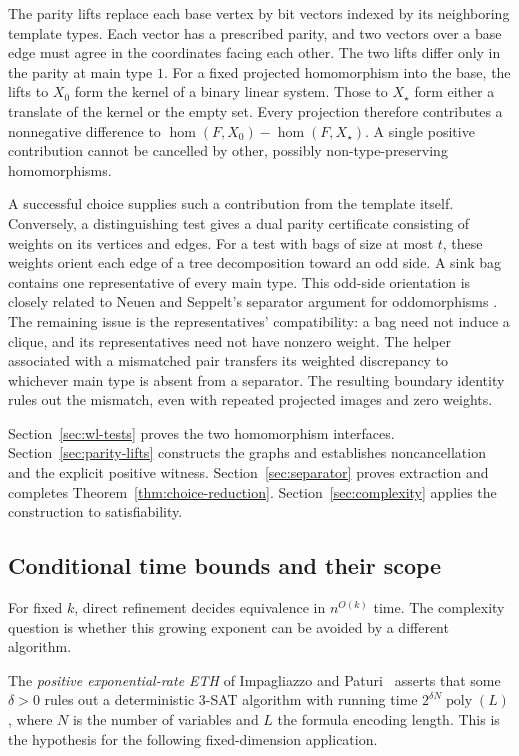 The parity lifts replace each base vertex by bit vectors indexed by
its neighboring template types. Each vector has a prescribed parity,
and two vectors over a base edge must agree in the coordinates facing
each other. The two lifts differ only in the parity at main type \(1\).
For a fixed projected homomorphism into the base, the lifts to \(X_0\)
form the kernel of a binary linear system. Those to \(X_\star\) form
either a translate of the kernel or the empty set. Every projection
therefore contributes a nonnegative difference to
\(\hom(F,X_0)-\hom(F,X_\star)\). A single positive contribution cannot
be cancelled by other, possibly non-type-preserving homomorphisms.

A successful choice supplies such a contribution from the template
itself. Conversely, a distinguishing test gives a dual parity
certificate consisting of weights on its vertices and edges. For a
test with bags of size at most \(t\), these weights orient each edge of
a tree decomposition toward an odd side. A sink bag contains one
representative of every main type. This odd-side orientation is closely
related to Neuen and Seppelt's separator argument for oddomorphisms
\citep[Lemma~4.4 and proof of Theorem~4.1]{NS2026}.
The remaining issue is the representatives'
compatibility: a bag need not induce a clique, and its representatives
need not have nonzero weight. The helper associated with a mismatched
pair transfers its weighted discrepancy to whichever main type is
absent from a separator. The resulting boundary identity rules out
the mismatch, even with repeated projected images and zero weights.

Section~\ref{sec:wl-tests} proves the two homomorphism interfaces.
Section~\ref{sec:parity-lifts} constructs the graphs and establishes
noncancellation and the explicit positive witness.
Section~\ref{sec:separator} proves extraction and completes
Theorem~\ref{thm:choice-reduction}.
Section~\ref{sec:complexity} applies the construction to satisfiability.

\subsection{Conditional time bounds and their scope}

For fixed \(k\), direct refinement decides equivalence in
\(n^{O(k)}\) time. The complexity question is whether this growing
exponent can be avoided by a different algorithm.

The \emph{positive exponential-rate ETH} of Impagliazzo and
Paturi~\citep{IP2001} asserts that some \(\delta>0\) rules out a
deterministic \(3\)-SAT algorithm with running time
\(2^{\delta N}\operatorname{poly}(L)\), where \(N\) is the number of
variables and \(L\) the formula encoding length. This is the hypothesis
for the following fixed-dimension application.

